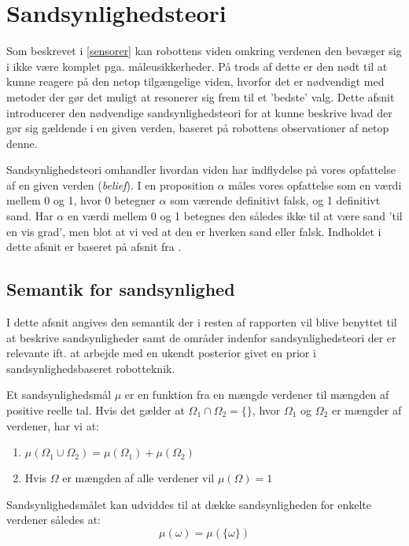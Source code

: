 

\section{Sandsynlighedsteori}
Som beskrevet i \cref{sensorer} kan robottens viden omkring verdenen den bevæger sig i ikke være komplet pga. måleusikkerheder.
På trods af dette er den nødt til at kunne reagere på den netop tilgængelige viden, hvorfor det er nødvendigt med metoder der gør det muligt at resonerer sig frem til et 'bedste' valg.
Dette afsnit introducerer den nødvendige sandsynlighedsteori for at kunne beskrive hvad der gør sig gældende i en given verden, baseret på robottens observationer af netop denne.

Sandsynlighedsteori omhandler hvordan viden har indflydelse på vores opfattelse af en given verden (\textit{belief}).
I en proposition $\alpha$ måles vores opfattelse som en værdi mellem 0 og 1, hvor 0 betegner $\alpha$ som værende definitivt falsk, og 1 definitivt sand.
Har $\alpha$ en værdi mellem 0 og 1 betegnes den således ikke til at være sand 'til en vis grad', men blot at vi ved at den er hverken sand eller falsk.
Indholdet i dette afsnit er baseret på afsnit fra \cite{ArtificialIntelligence}.

\subsection{Semantik for sandsynlighed}
I dette afsnit angives den semantik der i resten af rapporten vil blive benyttet til at beskrive sandsynligheder samt de områder indenfor sandsynlighedsteori der er relevante ift. at arbejde med en ukendt posterior givet en prior i sandsynlighedsbaseret robotteknik.

Et sandsynlighedsmål $\mu$ er en funktion fra en mængde verdener til mængden af positive reelle tal. 
Hvis det gælder at $\Omega_1 \cap \Omega_2 = \{{}\}$, hvor $\Omega_1$ og $\Omega_2$ er mængder af verdener, har vi at:

\begin{enumerate}
\item $\mu(\Omega_1 \cup \Omega_2) = \mu(\Omega_1) + \mu(\Omega_2)$
\item Hvis $\Omega$ er mængden af alle verdener vil $\mu(\Omega) = 1$ 
\end{enumerate}

Sandsynlighedsmålet kan udviddes til at dække sandsynligheden for enkelte verdener således at:
$$\mu(\omega) = \mu(\{\omega\})$$

